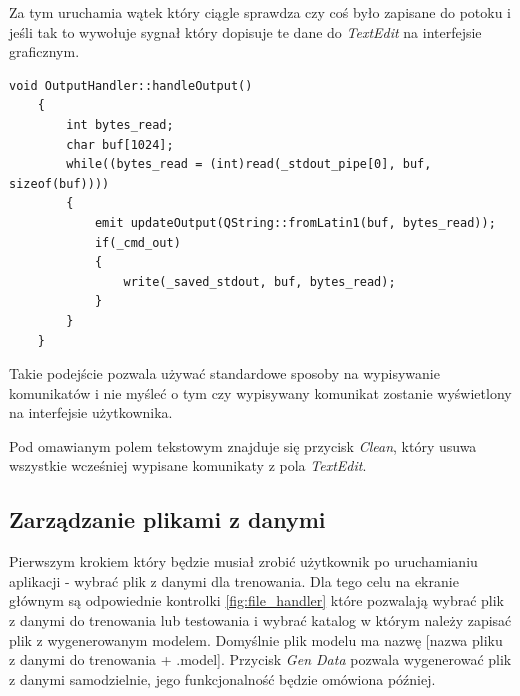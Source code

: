 \documentclass[paper=a4, fontsize=11pt]{scrartcl} %
\numberwithin{equation}{section} %
\numberwithin{figure}{section} %
\begin{document}
    \par Za tym uruchamia wątek który ciągle sprawdza czy coś było zapisane do potoku i jeśli
    tak to wywołuje sygnał który dopisuje te dane do \textit{TextEdit} na interfejsie graficznym.

    \newpage
    \begin{lstlisting}[caption={Funkcja uruchamiana w wątku},captionpos=b]
    void OutputHandler::handleOutput()
    {
        int bytes_read;
        char buf[1024];
        while((bytes_read = (int)read(_stdout_pipe[0], buf, sizeof(buf))))
        {
            emit updateOutput(QString::fromLatin1(buf, bytes_read));
            if(_cmd_out)
            {
                write(_saved_stdout, buf, bytes_read);
            }
        }
    }
    \end{lstlisting}

    \par Takie podejście pozwala używać standardowe sposoby na wypisywanie komunikatów i nie
    myśleć o tym czy wypisywany komunikat zostanie wyświetlony na interfejsie użytkownika.
    \par Pod omawianym polem tekstowym znajduje się przycisk \textit{Clean}, który usuwa
    wszystkie wcześniej wypisane komunikaty z pola \textit{TextEdit}. 

\subsection{Zarządzanie plikami z danymi}

    \par Pierwszym krokiem który będzie musiał zrobić użytkownik po uruchamianiu aplikacji -
    wybrać plik z danymi dla trenowania. Dla tego celu na ekranie głównym są odpowiednie
    kontrolki \ref{fig:file_handler} które pozwalają wybrać plik z danymi do trenowania lub
    testowania i wybrać katalog w którym należy zapisać plik z wygenerowanym modelem. Domyślnie
    plik modelu ma nazwę [nazwa pliku z danymi do trenowania + .model]. Przycisk \textit{Gen
    Data} pozwala wygenerować plik z danymi samodzielnie, jego funkcjonalność będzie omówiona
    później.
\end{document}
